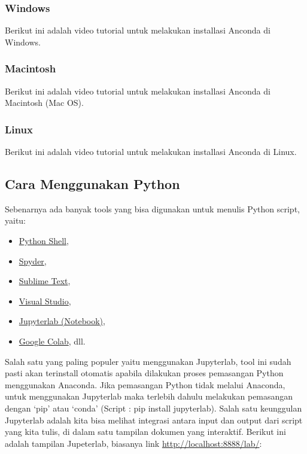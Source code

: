 \documentclass[
]{docs}
\providecommand{\tightlist}{%
  \setlength{\itemsep}{0pt}\setlength{\parskip}{0pt}}
\begin{document}
\hypertarget{windows}{%
\subsubsection{Windows}\label{windows}}

Berikut ini adalah video tutorial untuk melakukan installasi Anconda di Windows.

\hypertarget{macintosh}{%
\subsubsection{Macintosh}\label{macintosh}}

Berikut ini adalah video tutorial untuk melakukan installasi Anconda di Macintosh (Mac OS).

\hypertarget{linux}{%
\subsubsection{Linux}\label{linux}}

Berikut ini adalah video tutorial untuk melakukan installasi Anconda di Linux.

\hypertarget{cara-menggunakan-python}{%
\subsection{Cara Menggunakan Python}\label{cara-menggunakan-python}}

Sebenarnya ada banyak tools yang bisa digunakan untuk menulis Python script, yaitu:

\begin{itemize}
\tightlist
\item
  \href{https://www.python.org/shell/}{Python Shell},
\item
  \href{https://www.spyder-ide.org/}{Spyder},
\item
  \href{https://www.sublimetext.com/}{Sublime Text},
\item
  \href{https://visualstudio.microsoft.com/vs/features/python/}{Visual Studio},
\item
  \href{https://jupyter.org/}{Jupyterlab (Notebook)},
\item
  \href{https://colab.research.google.com/?hl=id}{Google Colab}, dll.
\end{itemize}

Salah satu yang paling populer yaitu menggunakan Jupyterlab, tool ini sudah pasti akan terinstall otomatis apabila dilakukan proses pemasangan Python menggunakan Anaconda. Jika pemasangan Python tidak melalui Anaconda, untuk menggunakan Jupyterlab maka terlebih dahulu melakukan pemasangan dengan `pip' atau `conda' (Script : pip install jupyterlab). Salah satu keunggulan Jupyterlab adalah kita bisa melihat integrasi antara input dan output dari script yang kita tulis, di dalam satu tampilan dokumen yang interaktif. Berikut ini adalah tampilan Jupeterlab, biasanya link \url{http://localhost:8888/lab/}:
\end{document}
